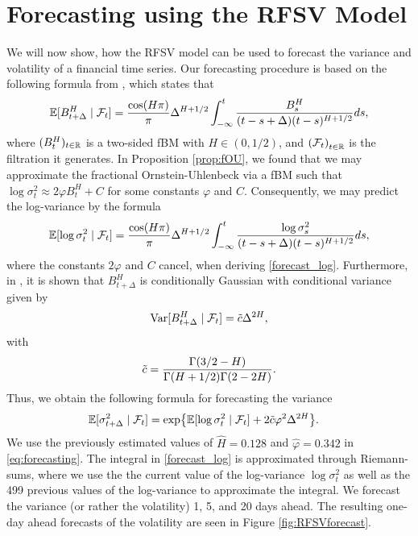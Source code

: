 \section{Forecasting using the RFSV Model}
We will now show, how the RFSV model can be used to forecast the variance and volatility of a financial time series. Our forecasting procedure is based on the following formula from \cite{forecast}, which states that
\begin{equation}
    \mathbb{E}[B_{t+\Delta}^{H}\mid \mathcal{F}_{t}]=\frac{\cos(H\pi)}{\pi}\Delta^{H+1/2}\int_{-\infty}^{t}\frac{B_{s}^{H}}{(t-s+\Delta)(t-s)^{H+1/2}}ds,
\end{equation}
where $(B^{H}_{t})_{t\in\mathbb{R}}$ is a two-sided fBM with $H\in (0,1/2)$, and $\left(\mathcal{F}_{t}\right)_{t\in\R}$ is the filtration it generates. In Proposition \ref{prop:fOU}, we found that we may approximate the fractional Ornstein-Uhlenbeck via a fBM such that
$\log \sigma_{t}^{2}\approx 2\varphi B_{t}^{H} + C$ for some constants $\varphi$ and $C$. Consequently, we may predict the log-variance by the formula
\begin{equation}\label{forecast_log}
    \mathbb{E}[\log \sigma_{t}^{2}\mid \mathcal{F}_{t}]=\frac{\cos(H\pi)}{\pi}\Delta^{H+1/2}\int_{-\infty}^{t}\frac{\log \sigma_{s}^{2}}{(t-s+\Delta)(t-s)^{H+1/2}}ds,
\end{equation}
where the constants $2\varphi$ and $C$ cancel, when deriving \eqref{forecast_log}. Furthermore, in \cite{forecast}, it is shown that $B_{t+\Delta}^{H}$ is conditionally Gaussian with conditional variance given by
\begin{equation}
    \textrm{Var}[B_{t+\Delta}^{H}\mid \mathcal{F}_{t}]=\Tilde{c}\Delta^{2H},
\end{equation}
with 
\begin{equation}
    \Tilde{c}=\frac{\Gamma(3/2-H)}{\Gamma(H+1/2)\Gamma(2-2H)}.
\end{equation}
Thus, we obtain the following formula for forecasting the variance
\begin{align}\label{eq:forecasting}
    \E[\sigma_{t+\Delta}^{2} \mid \mathcal{F}_{t}]&= \exp\left\{\E[\log \sigma_{t}^{2} \mid \mathcal{F}_{t}] + 2\Tilde{c}\varphi^{2}\Delta^{2H}\right\}.
\end{align}
We use the previously estimated values of $\hat{H}=0.128$ and $\hat{\varphi}=0.342$ in \eqref{eq:forecasting}. The integral in \eqref{forecast_log} is approximated through Riemann-sums, where we use the the current value of the log-variance $\log \sigma_{t}^{2}$ as well as the 499 previous values of the log-variance to approximate the integral. We forecast the variance (or rather the volatility) 1, 5, and 20 days ahead. The resulting one-day ahead forecasts of the volatility are seen in Figure \ref{fig:RFSVforecast}.
